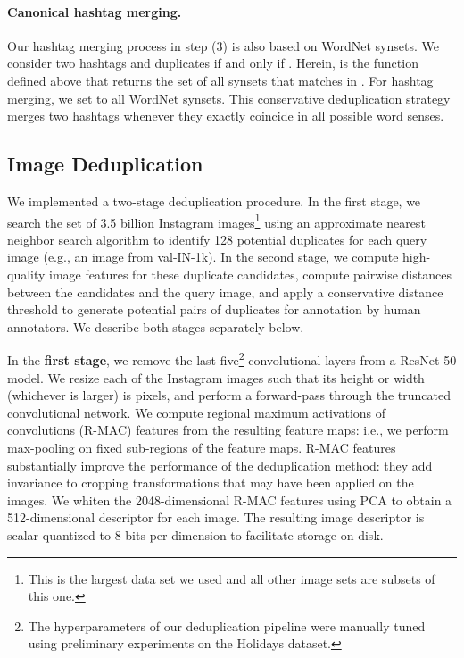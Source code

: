 \documentclass[runningheads]{llncs}
\makeatletter
\newcommand{\eg}{e.g.\@\xspace}
\newcommand{\ie}{i.e.\@\xspace}
\makeatother
\begin{document}
\paragraph{Canonical hashtag merging.} Our hashtag merging process in step (3) is also based on WordNet synsets. We consider two hashtags  and  duplicates if and only if . Herein,  is the function defined above that returns the set of all synsets that  matches in . For hashtag merging, we set  to all WordNet synsets. This conservative deduplication strategy merges two hashtags whenever they exactly coincide in all possible word senses.

\subsection{Image Deduplication}
\label{Image Deduplication}
We implemented a two-stage deduplication procedure. In the first stage, we search the set of 3.5 billion Instagram images\footnote{This is the largest data set we used and all other image sets are subsets of this one.} using an approximate nearest neighbor search algorithm to identify 128 potential duplicates for each query image (\eg, an image from val-IN-1k). In the second stage, we compute high-quality image features for these duplicate candidates, compute pairwise distances between the candidates and the query image, and apply a conservative distance threshold to generate potential pairs of duplicates for annotation by human annotators. We describe both stages separately below.

In the \textbf{first stage}, we remove the last five\footnote{The hyperparameters of our deduplication pipeline were manually tuned using preliminary experiments on the Holidays \cite{jegou2018holidays} dataset.} convolutional layers from a ResNet-50 model. We resize each of the Instagram images such that its height or width (whichever is larger) is  pixels, and perform a forward-pass through the truncated convolutional network. We compute regional maximum activations of convolutions (R-MAC) features \cite{gordo2016rmac,tolias2016rmac} from the resulting feature maps: \ie, we perform max-pooling on fixed sub-regions of the feature maps. R-MAC features substantially improve the performance of the deduplication method: they add invariance to cropping transformations that may have been applied on the images. We whiten the 2048-dimensional R-MAC features using PCA to obtain a 512-dimensional descriptor for each image. The resulting image descriptor is scalar-quantized to 8 bits per dimension to facilitate storage on disk. 
\end{document}
